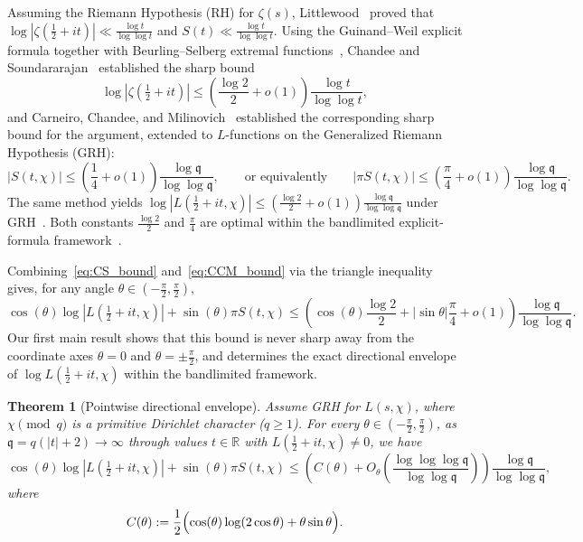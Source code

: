 \documentclass[11pt,a4paper]{amsart}
\newtheorem{theorem}{Theorem}[section]
\theoremstyle{remark}
\numberwithin{equation}{section}
\newcommand{\R}{\mathbb{R}}
\newcommand{\q}{\mathfrak{q}}
\begin{document}
Assuming the Riemann Hypothesis (RH) for $\zeta(s)$, Littlewood~\cite{Littlewood1924} proved that $\log|\zeta(\frac{1}{2}+it)| \ll \frac{\log t}{\log\log t}$ and $S(t) \ll \frac{\log t}{\log\log t}$. Using the Guinand--Weil explicit formula together with Beurling--Selberg extremal functions~\cite{Vaaler1985}, Chandee and Soundararajan~\cite{ChandeeSoundararajan2011} established the sharp bound
\begin{equation}\label{eq:CS_bound}
  \log|\zeta(\tfrac{1}{2}+it)| \le \left(\frac{\log 2}{2} + o(1)\right)\frac{\log t}{\log\log t},
\end{equation}
and Carneiro, Chandee, and Milinovich~\cite{CCM2013,CCM2015} established the corresponding sharp bound for the argument, extended to $L$-functions on the Generalized Riemann Hypothesis (GRH):
\begin{equation}\label{eq:CCM_bound}
  |S(t,\chi)| \le \left(\frac{1}{4} + o(1)\right)\frac{\log\q}{\log\log\q},
  \qquad\text{or equivalently}\qquad
  |\pi S(t,\chi)| \le \left(\frac{\pi}{4} + o(1)\right)\frac{\log\q}{\log\log\q}.
\end{equation}
The same method yields $\log|L(\frac{1}{2}+it,\chi)| \le (\frac{\log 2}{2}+o(1))\frac{\log\q}{\log\log\q}$ under GRH~\cite{Chandee2009,ChandeeSoundararajan2011}. Both constants $\frac{\log 2}{2}$ and $\frac{\pi}{4}$ are optimal within the bandlimited explicit-formula framework~\cite{CarneiroVaaler2010,CarneiroLittmann2013}.

Combining~\eqref{eq:CS_bound} and~\eqref{eq:CCM_bound} via the triangle inequality gives, for any angle $\theta \in (-\frac{\pi}{2},\frac{\pi}{2})$,
\[
  \cos(\theta)\log|L(\tfrac{1}{2}+it,\chi)| + \sin(\theta)\pi S(t,\chi)
  \le \left(\cos(\theta)\frac{\log 2}{2} + |\sin\theta|\frac{\pi}{4} + o(1)\right)\frac{\log\q}{\log\log\q}.
\]
Our first main result shows that this bound is never sharp away from the coordinate axes $\theta = 0$ and $\theta = \pm\frac{\pi}{2}$, and determines the exact directional envelope of $\log L(\frac{1}{2}+it,\chi)$ within the bandlimited framework.

\begin{theorem}[Pointwise directional envelope]\label{thm:directional_bound}
Assume GRH for $L(s,\chi)$, where $\chi \pmod q$ is a primitive Dirichlet character ($q \ge 1$). For every $\theta \in (-\frac{\pi}{2},\frac{\pi}{2})$, as $\q = q(|t|+2) \to \infty$ through values $t \in \R$ with $L(\frac{1}{2}+it,\chi) \neq 0$, we have
\begin{equation}\label{eq:directional_bound}
  \cos(\theta)\log|L(\tfrac{1}{2}+it,\chi)| + \sin(\theta)\pi S(t,\chi)
  \le \left(C(\theta) + O_\theta\!\left(\frac{\log\log\log\q}{\log\log\q}\right)\right)\frac{\log\q}{\log\log\q},
\end{equation}
where
\begin{equation}\label{eq:C_theta}
  C(\theta) := \frac{1}{2}\Bigl(\cos(\theta)\log(2\cos\theta) + \theta\sin\theta\Bigr).
\end{equation}
\end{theorem}
\end{document}
